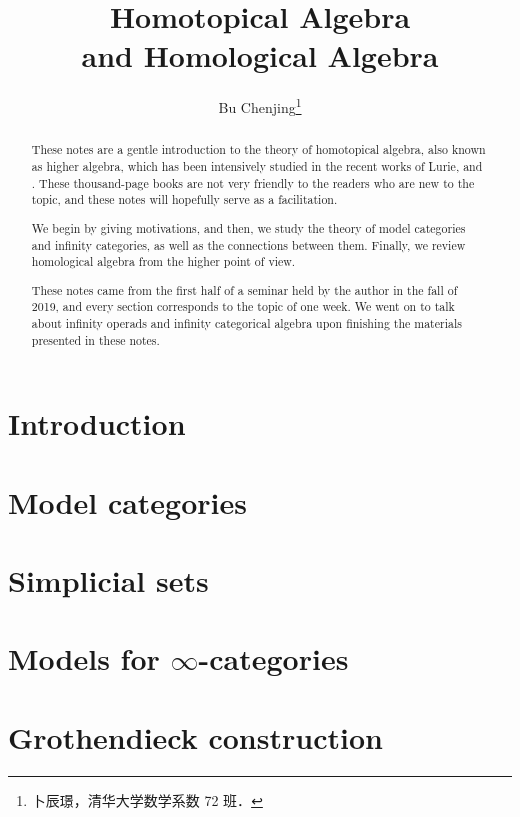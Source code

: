\documentclass[twoside]{article}
\begin{document}
\title{Homotopical Algebra\\and Homological Algebra}
\author{Bu Chenjing\footnote{卜辰璟，清华大学数学系数 72 班．}}

\begin{abstract}
    These notes are a gentle introduction to the theory of
    homotopical algebra, also known as higher algebra,
    which has been intensively studied in the recent works of Lurie,
    \cite{htt} and \cite{ha}.
    These thousand-page books are not very friendly to the readers 
    who are new to the topic, and these notes will hopefully 
    serve as a facilitation.
    
    We begin by giving motivations, and then,
    we study the theory of model categories and infinity categories,
    as well as the connections between them.
    Finally, we review homological algebra from the higher point of view.

    These notes came from the first half of
    a seminar held by the author in the fall of 2019,
    and every section corresponds to the topic of one week.
    We went on to talk about infinity operads and infinity categorical algebra 
    upon finishing the materials presented in these notes.
\end{abstract}

\tableofcontents
\clearpage

\section{Introduction}



\section{Model categories}



\section{Simplicial sets}



\section{Models for \texorpdfstring{$\infty$}{∞}-categories}



\section{Grothendieck construction}
\end{document}
